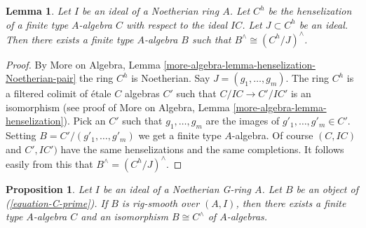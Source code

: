 \documentclass{stacks-project}
\theoremstyle{plain}
\newtheorem{proposition}[subsection]{Proposition}
\newtheorem{lemma}[subsection]{Lemma}
\theoremstyle{definition}
\theoremstyle{remark}
\numberwithin{equation}{subsection}
\begin{document}
\begin{lemma}
\label{lemma-algebraize-easy}
Let $I$ be an ideal of a Noetherian ring $A$. Let $C^h$ be the henselization
of a finite type $A$-algebra $C$ with respect to the ideal $IC$. Let
$J \subset C^h$ be an ideal. Then there exists a finite type $A$-algebra
$B$ such that $B^\wedge \cong (C^h/J)^\wedge$.
\end{lemma}

\begin{proof}
By More on Algebra, Lemma
\ref{more-algebra-lemma-henselization-Noetherian-pair}
the ring $C^h$ is Noetherian. Say $J = (g_1, \ldots, g_m)$.
The ring $C^h$ is a filtered colimit of \'etale $C$ algebras $C'$
such that $C/IC \to C'/IC'$ is an isomorphism
(see proof of More on Algebra, Lemma \ref{more-algebra-lemma-henselization}).
Pick an $C'$ such that $g_1, \ldots, g_m$ are the
images of $g'_1, \ldots, g'_m \in C'$.
Setting $B = C'/(g'_1, \ldots, g'_m)$ we get a finite
type $A$-algebra. Of course $(C, IC)$ and $C', IC')$ have
the same henselizations and the same completions.
It follows easily from this that $B^\wedge = (C^h/J)^\wedge$.
\end{proof}

\begin{proposition}
\label{proposition-approximate}
Let $I$ be an ideal of a Noetherian G-ring $A$. Let $B$ be an
object of (\ref{equation-C-prime}). If $B$ is rig-smooth
over $(A, I)$, then there exists a finite type $A$-algebra
$C$ and an isomorphism $B \cong C^\wedge$ of $A$-algebras.
\end{proposition}
\end{document}
